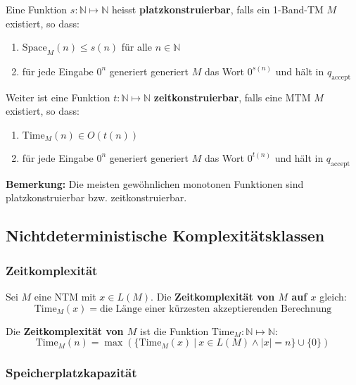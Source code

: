 \documentclass[11pt]{article}
\newcommand{\ttc}{\text{Time}}
\newcommand{\tsc}{\text{Space}}
\begin{document}
Eine Funktion $s: \mathbb{N} \mapsto \mathbb{N}$ heisst \textbf{platzkonstruierbar}, falls ein 1-Band-TM $M$ existiert, so dass:
\begin{enumerate}[label=(\roman*), noitemsep]
	\item $\tsc_M(n) \leq s(n)$ f{\"u}r alle $n \in \mathbb{N}$
	\item f{\"u}r jede Eingabe $0^n$ generiert generiert $M$ das Wort $0^{s(n)}$ und h{\"a}lt in $q_\text{accept}$
\end{enumerate}

Weiter ist eine Funktion $t: \mathbb{N} \mapsto \mathbb{N}$ \textbf{zeitkonstruierbar}, falls eine MTM $M$ existiert, so dass:
\begin{enumerate}[label=(\roman*), noitemsep]
	\item $\ttc_M(n) \in O(t(n))$
	\item f{\"u}r jede Eingabe $0^n$ generiert generiert $M$ das Wort $0^{t(n)}$ und h{\"a}lt in $q_\text{accept}$
\end{enumerate}

\textbf{Bemerkung:} Die meisten gewöhnlichen monotonen Funktionen sind platzkonstruierbar bzw. zeitkonstruierbar. \\

\subsection{Nichtdeterministische Komplexit{\"a}tsklassen}

\subsubsection{Zeitkomplexit{\"a}t}

Sei $M$ eine NTM mit $x \in L(M)$. Die \textbf{Zeitkomplexit{\"a}t von $M$ auf $x$} gleich:
\begin{equation*}
	\ttc_M(x) = \text{die L{\"a}nge einer k{\"u}rzesten akzeptierenden Berechnung}
\end{equation*}

Die \textbf{Zeitkomplexit{\"a}t von $M$} ist die Funktion $\ttc_M: \mathbb{N} \mapsto \mathbb{N}$:
\begin{equation*}
	\ttc_M(n) = \max(\{\ttc_M(x)\ |\ x \in L(M) \land |x| = n\} \cup \{0\})
\end{equation*}

\subsubsection{Speicherplatzkapazit{\"a}t}
\end{document}
